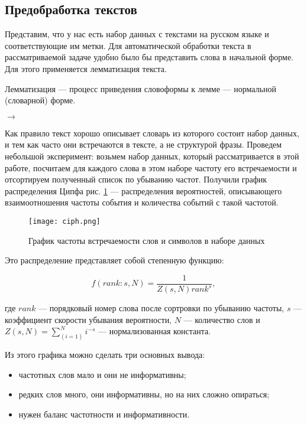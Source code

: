 \subsection{Предобработка текстов}

Представим, что у нас есть набор данных с текстами на русском языке и соответствующие им метки. Для автоматической обработки текста в рассматриваемой задаче удобно было бы представить слова в начальной форме. Для этого применяется лемматизация текста.

\begin{definition}
 Лемматизация --- процесс приведения словоформы к лемме --- нормальной (словарной) форме.
\end{definition}

\bigskip
{} $\to$ 

\bigskip
Как правило текст хорошо описывает словарь из которого состоит набор данных, и тем как часто они встречаются в тексте, а не структурой фразы. Проведем небольшой эксперимент: возьмем набор данных, который рассматривается в этой работе, посчитаем для каждого слова в этом наборе частоту его встречаемости и отсортируем полученный список по убыванию частот. Получили график распределения Ципфа рис. \ref{fig:ciph} --- распределения вероятностей, описывающего взаимоотношения частоты события и количества событий с такой частотой.

\begin{figure}[ht]
    \centering
    \texttt{[image: ciph.png]}
    \caption{График частоты встречаемости слов и символов в наборе данных}
    \label{fig:ciph}
\end{figure}

\bigskip\noindent
Это распределение представляет собой степенную функцию:

\begin{equation*}
 f(rank:s,N) = \frac{1}{Z(s,N)rank^s},
\end{equation*}

\bigskip
где $rank$ --- порядковый номер слова после сортровки по убыванию частоты, $s$ --- коэффициент скорости убывания вероятности, $N$ --- количество слов и $Z(s,N)= \sum_(i=1)^N i^{-s}$ --- нормализованная константа.

\bigskip\noindent
Из этого графика можно сделать три основных вывода:

\bigskip
\begin{itemize}
 \item частотных слов мало и они не информативны;
 \item редких слов много, они информативны, но на них сложно опираться;
 \item нужен баланс частотности и информативности.
\end{itemize}

